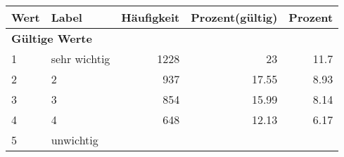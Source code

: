      \begin{longtable}{lXrrr}
     \toprule
     \textbf{Wert} & \textbf{Label} & \textbf{Häufigkeit} & \textbf{Prozent(gültig)} & \textbf{Prozent} \\
     \endhead
     \midrule
     \multicolumn{5}{l}{\textbf{Gültige Werte}}\\

     1 &
     \multicolumn{1}{X}{ sehr wichtig   } &


       \num{1228} &
       \num[round-mode=places,round-precision=2]{23} &
         \num[round-mode=places,round-precision=2]{11,7} \\

     2 &
     \multicolumn{1}{X}{ 2   } &


       \num{937} &
       \num[round-mode=places,round-precision=2]{17,55} &
         \num[round-mode=places,round-precision=2]{8,93} \\

     3 &
     \multicolumn{1}{X}{ 3   } &


       \num{854} &
       \num[round-mode=places,round-precision=2]{15,99} &
         \num[round-mode=places,round-precision=2]{8,14} \\

     4 &
     \multicolumn{1}{X}{ 4   } &


       \num{648} &
       \num[round-mode=places,round-precision=2]{12,13} &
         \num[round-mode=places,round-precision=2]{6,17} \\

     5 &
     \multicolumn{1}{X}{ unwichtig   } &



\end{longtable}
